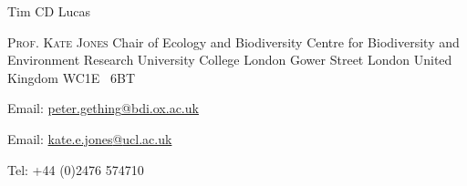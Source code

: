 \documentclass{scrartcl}
\begin{document}
\begin{cv}{Tim {\Large CD} Lucas}
\begin{multicols}{2}
\begin{footnotesize}
\vfill
\columnbreak
\textsc{Prof. Kate Jones}\newline
Chair of Ecology and Biodiversity\newline
Centre for Biodiversity and Environment Research\newline
University College London\newline
Gower Street\newline
London\newline
United Kingdom\newline
{\scriptsize WC}1{\scriptsize E} \ 6{\scriptsize BT}

\end{footnotesize}
\end{multicols}
\vspace{-0.5cm}
\begin{multicols}{2}
\begin{footnotesize}

Email: \href{mailto:peter.gething@bdi.ox.ac.uk }{peter.gething{\scriptsize @}bdi.ox.ac.uk }\newline

\columnbreak

Email: \href{mailto:kate.e.jones@ucl.ac.uk}{kate.e.jones{\scriptsize @}ucl.ac.uk}\newline

Tel: +44 (0)2476 574710
\end{footnotesize}
\end{multicols}




\end{cv}
\end{document}

